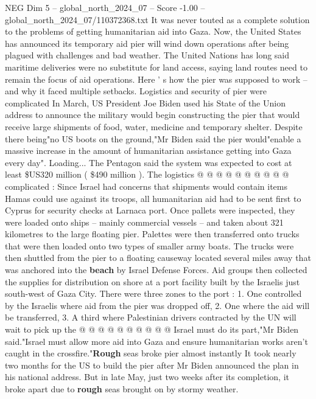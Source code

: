 \begin{textsample}{NEG Dim 5 – global\_north\_2024\_07 – Score -1.00 – global\_north\_2024\_07/110372368.txt}  \label{ex:f5_neg_153}
It was never touted as a complete solution to the problems of getting humanitarian aid into Gaza.
Now, the United States has announced its temporary aid pier will wind down operations after being plagued with challenges and bad weather.
The United Nations has long said maritime deliveries were no substitute for land access, saying land routes need to remain the focus of aid operations.
Here ' s how the pier was supposed to work -- and why it faced multiple setbacks.
Logistics and security of pier were complicated In March, US President Joe Biden used his State of the Union address to announce the military would begin constructing the pier that would receive large shipments of food, water, medicine and temporary shelter.
Despite there being"no US boots on the ground,"Mr Biden said the pier would"enable a massive increase in the amount of humanitarian assistance getting into Gaza every day".
Loading...
The Pentagon said the system was expected to cost at least \$US320 million ( \$490 million ).
The logistics @ @ @ @ @ @ @ @ @ @ complicated : Since Israel had concerns that shipments would contain items Hamas could use against its troops, all humanitarian aid had to be sent first to Cyprus for security checks at Larnaca port.
Once pallets were inspected, they were loaded onto ships -- mainly commercial vessels -- and taken about 321 kilometres to the large floating pier.
Palettes were then transferred onto trucks that were then loaded onto two types of smaller army boats.
The trucks were then shuttled from the pier to a floating causeway located several miles away that was anchored into the \textbf{beach} by Israel Defense Forces.
Aid groups then collected the supplies for distribution on shore at a port facility built by the Israelis just south-west of Gaza City.
There were three zones to the port : 1.
One controlled by the Israelis where aid from the pier was dropped off, 2.
One where the aid will be transferred, 3.
A third where Palestinian drivers contracted by the UN will wait to pick up the @ @ @ @ @ @ @ @ @ @ Israel must do its part,"Mr Biden said."Israel must allow more aid into Gaza and ensure humanitarian works aren't caught in the crossfire."\textbf{Rough} seas broke pier almost instantly It took nearly two months for the US to build the pier after Mr Biden announced the plan in his national address.
But in late May, just two weeks after its completion, it broke apart due to \textbf{rough} seas brought on by stormy weather.

\end{textsample}
